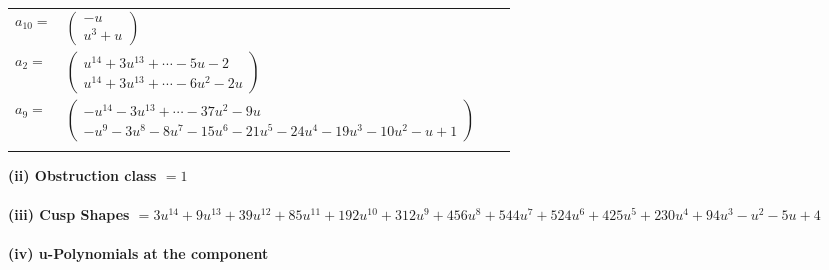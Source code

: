 \documentclass[1p]{elsarticle_modified}
\theoremstyle{definition}
\begin{document}
\begin{tabular}{m{7pt} m{180pt} m{7pt} m{180pt} }
\flushright $a_{10}=$&$\begin{pmatrix}- u\\u^3+u\end{pmatrix}$ \\
\flushright $a_{2}=$&$\begin{pmatrix}u^{14}+3 u^{13}+\cdots-5 u-2\\u^{14}+3 u^{13}+\cdots-6 u^2-2 u\end{pmatrix}$ \\
\flushright $a_{9}=$&$\begin{pmatrix}- u^{14}-3 u^{13}+\cdots-37 u^2-9 u\\- u^9-3 u^8-8 u^7-15 u^6-21 u^5-24 u^4-19 u^3-10 u^2- u+1\end{pmatrix}$\\&\end{tabular}
\flushleft \textbf{(ii) Obstruction class $= 1$}\\~\\
\flushleft \textbf{(iii) Cusp Shapes $= 3 u^{14}+9 u^{13}+39 u^{12}+85 u^{11}+192 u^{10}+312 u^9+456 u^8+544 u^7+524 u^6+425 u^5+230 u^4+94 u^3- u^2-5 u+4$}\\~\\
\newpage\renewcommand{\arraystretch}{1}
\flushleft \textbf{(iv) u-Polynomials at the component}\newline \\
\end{document}

